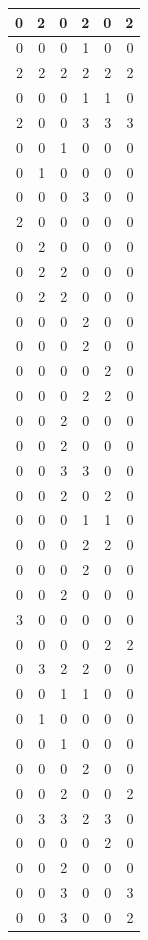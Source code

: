 \documentclass[
]{article}
\begin{document}
\begin{tabular}{r|r|r|r|r|r}
\hline
0 & 2 & 0 & 2 & 0 & 2\\
\hline
0 & 0 & 0 & 1 & 0 & 0\\
\hline
2 & 2 & 2 & 2 & 2 & 2\\
\hline
0 & 0 & 0 & 1 & 1 & 0\\
\hline
2 & 0 & 0 & 3 & 3 & 3\\
\hline
0 & 0 & 1 & 0 & 0 & 0\\
\hline
0 & 1 & 0 & 0 & 0 & 0\\
\hline
0 & 0 & 0 & 3 & 0 & 0\\
\hline
2 & 0 & 0 & 0 & 0 & 0\\
\hline
0 & 2 & 0 & 0 & 0 & 0\\
\hline
0 & 2 & 2 & 0 & 0 & 0\\
\hline
0 & 2 & 2 & 0 & 0 & 0\\
\hline
0 & 0 & 0 & 2 & 0 & 0\\
\hline
0 & 0 & 0 & 2 & 0 & 0\\
\hline
0 & 0 & 0 & 0 & 2 & 0\\
\hline
0 & 0 & 0 & 2 & 2 & 0\\
\hline
0 & 0 & 2 & 0 & 0 & 0\\
\hline
0 & 0 & 2 & 0 & 0 & 0\\
\hline
0 & 0 & 3 & 3 & 0 & 0\\
\hline
0 & 0 & 2 & 0 & 2 & 0\\
\hline
0 & 0 & 0 & 1 & 1 & 0\\
\hline
0 & 0 & 0 & 2 & 2 & 0\\
\hline
0 & 0 & 0 & 2 & 0 & 0\\
\hline
0 & 0 & 2 & 0 & 0 & 0\\
\hline
3 & 0 & 0 & 0 & 0 & 0\\
\hline
0 & 0 & 0 & 0 & 2 & 2\\
\hline
0 & 3 & 2 & 2 & 0 & 0\\
\hline
0 & 0 & 1 & 1 & 0 & 0\\
\hline
0 & 1 & 0 & 0 & 0 & 0\\
\hline
0 & 0 & 1 & 0 & 0 & 0\\
\hline
0 & 0 & 0 & 2 & 0 & 0\\
\hline
0 & 0 & 2 & 0 & 0 & 2\\
\hline
0 & 3 & 3 & 2 & 3 & 0\\
\hline
0 & 0 & 0 & 0 & 2 & 0\\
\hline
0 & 0 & 2 & 0 & 0 & 0\\
\hline
0 & 0 & 3 & 0 & 0 & 3\\
\hline
0 & 0 & 3 & 0 & 0 & 2\\

\end{tabular}
\end{document}
